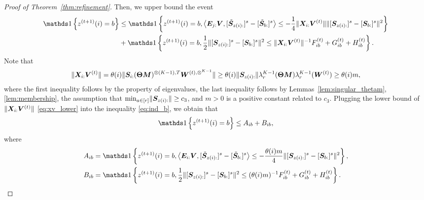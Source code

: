 \documentclass[lettersize,onecolumn,journal]{IEEEtran}
\theoremstyle{definition}
\theoremstyle{definition}
\newcommand{\offf}[1]{\left\{#1\right\}}
\newcommand{\ang}[1]{\left\langle#1\right\rangle}
\def\fixme#1#2{\textbf{\color{red}[FIXME (#1): #2]}}
\begin{document}
\begin{proof}[Proof of Theorem~\ref{thm:refinement}]
    Then, we upper bound the event
    \begin{align}
         \ind \offf{ z^{(t+1)}(i) = b  }& \leq \ind \offf{ z^{(t+1)}(i) = b ,   \ang{ \mE_{j:} \mV, [  \tilde \mS_{z(i):} ]^s - [  \tilde \mS_{b:} ]^s }  \leq - \frac{1}{4} \onormSize{}{\mX_{i:} \mV^{(t)}} \onormSize{}{ [ \mS_{z(i):}  ]^s - [ \mS_{b:}  ]^s  }^2 } \\
         & + \ind \offf{z^{(t+1)}(i) = b, \frac{1}{2}\onormSize{}{ [ \mS_{z(i):}  ]^s - [ \mS_{b:}  ]^s  }^2 \leq \onormSize{}{\mX_{i:} \mV^{(t)}}^{-1} F_{ib}^{(t)} + G_{ib}^{(t)} + H_{ib}^{(t)} }. \label{eq:ind_b}
    \end{align}
   Note that 
    \begin{align}
     \onormSize{}{\mX_{i:} \mV^{(t)}}  = \theta(i) \onormSize{}{\mS_{i:} (\mTheta \mM)^{\otimes (K-1),T} \mW^{(t), \otimes^{K-1}}}
         \geq \theta(i) \onormSize{}{\mS_{z(i):}} \lambda_r^{K-1}(\mTheta \mM) \lambda^{K-1}_r(\mW^{(t)})
         \geq\theta(i) m , \label{eq:xv_lower}
    \end{align}
    where the first inequality follows by the property of eigenvalues, the last inequality follows by Lemmas~\ref{lem:singular_thetam}, \ref{lem:membership}, the assumption that $\min_{a \in [r]} \lVert\bm S_{z(i):}\rVert \geq c_3$, and $m >0$ is a positive constant related to $ c_3$. Plugging the lower bound of $ \lVert\bm X_{i:} \bm{V}^{(t)}\rVert$ \eqref{eq:xv_lower} into the inequality \eqref{eq:ind_b}, we obtain that 
    \begin{equation}\label{eq:decomp1}
        \ind \offf{ z^{(t+1)}(i) = b  } \leq A_{ib} + B_{ib},
    \end{equation}
    where 
    \begin{align}
        A_{ib} &= \ind \offf{z^{(t+1)}(i) = b, \ang{ \mE_{i:} \mV, [  \tilde \mS_{z(i):} ]^s - [  \tilde \mS_{b:} ]^s }  \leq - \frac{\theta(i) m}{4} \onormSize{}{ [ \mS_{z(i):}  ]^s - [ \mS_{b:}  ]^s  }^2 },\\
        B_{ib} &= \ind \offf{z^{(t+1)}(i) = b, \frac{1}{2}\onormSize{}{ [ \mS_{z(i):}  ]^s - [ \mS_{b:}  ]^s  }^2 \leq (\theta(i) m)^{-1} F_{ib}^{(t)} + G_{ib}^{(t)} + H_{ib}^{(t)} }.
    \end{align}
    

\end{proof}
\end{document}
